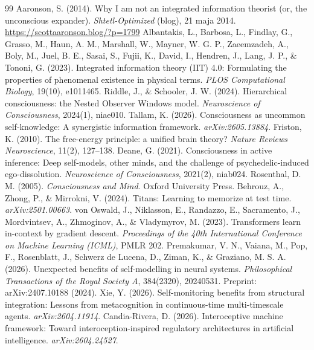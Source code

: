 \documentclass[11pt]{article}
\begin{document}
\begin{thebibliography}{99}
 Aaronson, S. (2014). Why I am not an integrated information theorist (or, the unconscious expander). \emph{Shtetl-Optimized} (blog), 21 maja 2014. \url{https://scottaaronson.blog/?p=1799}
 Albantakis, L., Barbosa, L., Findlay, G., Grasso, M., Haun, A. M., Marshall, W., Mayner, W. G. P., Zaeemzadeh, A., Boly, M., Juel, B. E., Sasai, S., Fujii, K., David, I., Hendren, J., Lang, J. P., \& Tononi, G. (2023). Integrated information theory (IIT) 4.0: Formulating the properties of phenomenal existence in physical terms. \emph{PLOS Computational Biology}, 19(10), e1011465.
 Riddle, J., \& Schooler, J. W. (2024). Hierarchical consciousness: the Nested Observer Windows model. \emph{Neuroscience of Consciousness}, 2024(1), niae010.
 Tallam, K. (2026). Consciousness as uncommon self-knowledge: A synergistic information framework. \emph{arXiv:2605.13884}.
 Friston, K. (2010). The free-energy principle: a unified brain theory? \emph{Nature Reviews Neuroscience}, 11(2), 127--138.
 Deane, G. (2021). Consciousness in active inference: Deep self-models, other minds, and the challenge of psychedelic-induced ego-dissolution. \emph{Neuroscience of Consciousness}, 2021(2), niab024.
 Rosenthal, D. M. (2005). \emph{Consciousness and Mind}. Oxford University Press.
 Behrouz, A., Zhong, P., \& Mirrokni, V. (2024). Titans: Learning to memorize at test time. \emph{arXiv:2501.00663}.
 von Oswald, J., Niklasson, E., Randazzo, E., Sacramento, J., Mordvintsev, A., Zhmoginov, A., \& Vladymyrov, M. (2023). Transformers learn in-context by gradient descent. \emph{Proceedings of the 40th International Conference on Machine Learning (ICML)}, PMLR 202.
 Premakumar, V. N., Vaiana, M., Pop, F., Rosenblatt, J., Schwerz de Lucena, D., Ziman, K., \& Graziano, M. S. A. (2026). Unexpected benefits of self-modelling in neural systems. \emph{Philosophical Transactions of the Royal Society A}, 384(2320), 20240531. Preprint: arXiv:2407.10188 (2024).
 Xie, Y. (2026). Self-monitoring benefits from structural integration: Lessons from metacognition in continuous-time multi-timescale agents. \emph{arXiv:2604.11914}.
 Candia-Rivera, D. (2026). Interoceptive machine framework: Toward interoception-inspired regulatory architectures in artificial intelligence. \emph{arXiv:2604.24527}.

\end{thebibliography}
\end{document}
